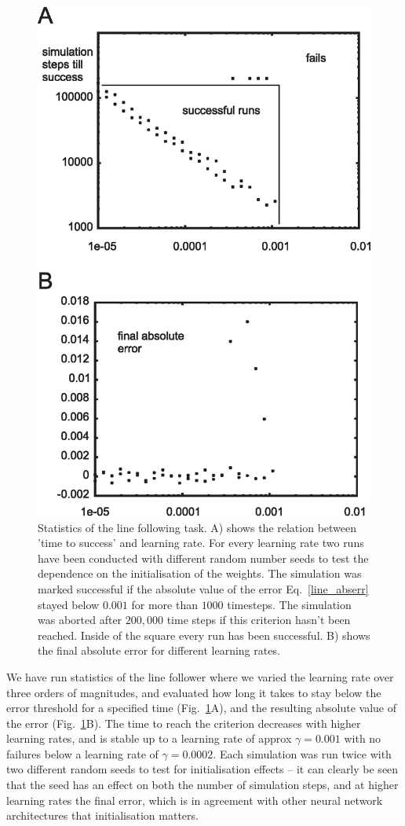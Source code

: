 \documentclass{aamas2018}
\begin{document}
\begin{figure}[!ht]
  \centering
  \includegraphics[width=0.9\columnwidth]{line_stats}
  \caption{Statistics of the line following task. A) shows the relation between
    'time to success' and learning rate. For every learning rate two runs have
    been conducted with different random number seeds to test the dependence on the
    initialisation of the weights. The simulation was marked successful if the
    absolute value of the error Eq.~\ref{line_abserr} stayed below $0.001$ for more than $1000$
    timesteps. The simulation was aborted after $200,000$ time steps if this criterion
    hasn't been reached. Inside of the square every run has been successful.
    B) shows the final absolute error for different learning rates.
    \label{line_stats}}
\end{figure}


We have run statistics of the line follower where we varied the
learning rate over three orders of magnitudes, and evaluated how long
it takes to stay below the error threshold for a specified time
(Fig.~\ref{line_stats}A), and the resulting absolute value of the
error (Fig.~\ref{line_stats}B). The time to reach the criterion
decreases with higher learning rates, and is stable up to a learning
rate of approx $\gamma = 0.001$ with no failures below a learning rate of
$\gamma = 0.0002$. Each simulation was run twice with two different random seeds to
test for initialisation effects -- it can clearly be seen that
the seed has an effect on both the number of simulation steps,
and at higher learning rates the final error, which is in agreement with other neural
network architectures that initialisation matters.
\end{document}
